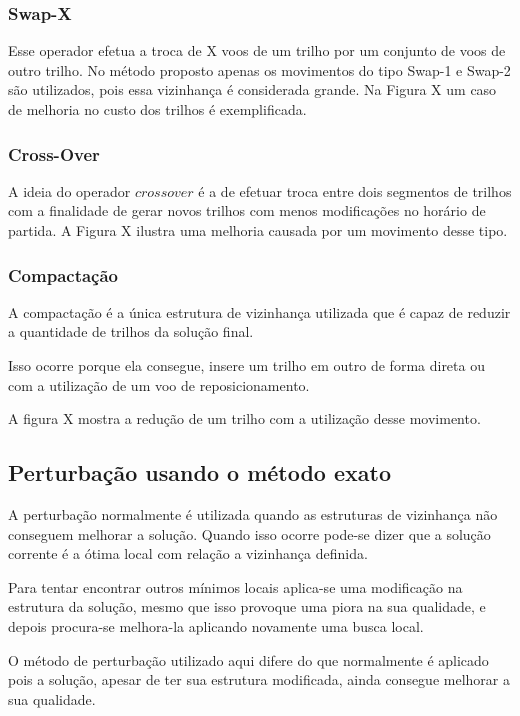 \subsubsection{Swap-X}

Esse operador efetua a troca de X voos de um trilho por um conjunto de voos de
outro trilho. No método proposto apenas os movimentos do tipo Swap-1 e Swap-2
são utilizados, pois essa vizinhança é considerada grande. Na Figura X um caso
de melhoria no custo dos trilhos é exemplificada.
 
 \subsubsection{Cross-Over}
 
A ideia do operador $crossover$ é a de efetuar troca entre dois segmentos de
trilhos com a finalidade de gerar novos trilhos com menos modificações no
horário de partida. A Figura X ilustra uma melhoria causada por um movimento
desse tipo.
 
 \subsubsection{Compactação}
 
A compactação é a única estrutura de vizinhança utilizada que é capaz de
reduzir a quantidade de trilhos da solução final.
 
Isso ocorre porque ela consegue, insere um trilho em outro de forma direta ou
com a utilização de um voo de reposicionamento.
 
A figura X mostra a redução de um trilho com a utilização desse movimento.
 
 \subsection{Perturbação usando o método exato}
   
A perturbação normalmente é utilizada quando as estruturas de vizinhança não
conseguem melhorar a solução. Quando isso ocorre pode-se dizer que a solução
corrente é a ótima local com relação a vizinhança definida.
 
Para tentar encontrar outros mínimos locais aplica-se uma modificação na
estrutura da solução, mesmo que isso provoque uma piora na sua qualidade, e
depois procura-se melhora-la aplicando novamente uma busca local.
 
O método de perturbação utilizado aqui difere do que normalmente é aplicado
pois a solução, apesar de ter sua estrutura modificada, ainda consegue melhorar
a sua qualidade.
 
